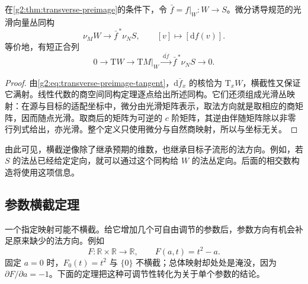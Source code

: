 \begin{proposition}\label{g2:prop:transverse-normal-bundle}
	在\cref{g2:thm:transverse-preimage}的条件下，令 \(\bar f=f|_W:W\to S\)。微分诱导规范的光滑向量丛同构
	\[
		\nu_M W\longrightarrow\bar f^{\,*}\nu_N S,
		\qquad[v]\longmapsto[\mathrm{d}f(v)].
	\]
	等价地，有短正合列
	\[
		0\longrightarrow\mathrm{T}W\longrightarrow\mathrm{T}M|_W
		\xrightarrow{\ \overline{\mathrm{d}f}\ }\bar f^{\,*}\nu_N S\longrightarrow0.
	\]
\end{proposition}
\begin{proof}
	由\eqref{g2:eq:transverse-preimage-tangent}，\(\overline{\mathrm{d}f_x}\) 的核恰为 \(\mathrm{T}_xW\)，横截性又保证它满射。线性代数的商空间同构定理逐点给出所述同构。它们还须组成光滑丛映射：在源与目标的适配坐标中，微分由光滑矩阵表示，取法方向就是取相应的商矩阵，因而随点光滑。取商后的矩阵为可逆的 \(c\) 阶矩阵，其逆由伴随矩阵除以非零行列式给出，亦光滑。整个定义只使用微分与自然商映射，所以与坐标无关。
\end{proof}

由此可见，横截逆像除了继承预期的维数，也继承目标子流形的法方向。例如，若 \(S\) 的法丛已经给定定向，就可以通过这个同构给 \(W\) 的法丛定向。后面的相交数构造将使用这项信息。

\subsection{参数横截定理}
\label{g2:subsec:1403:03}

一个指定映射可能不横截。给它增加几个可自由调节的参数后，参数方向有机会补足原来缺少的法方向。例如
\[
	F:\mathbb R\times\mathbb R\longrightarrow\mathbb R,
	\qquad F(a,t)=t^2-a.
\]
固定 \(a=0\) 时，\(F_0(t)=t^2\) 与 \(\{0\}\) 不横截；总体映射却处处是淹没，因为 \(\partial F/\partial a=-1\)。下面的定理把这种可调节性转化为关于单个参数的结论。

